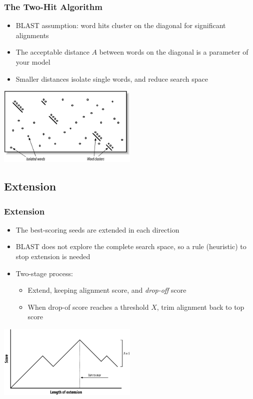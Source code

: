 \documentclass[table]{beamer}
\begin{document}
  \begin{frame}
    \frametitle{The Two-Hit Algorithm}
    \begin{itemize}
      \item BLAST assumption: word hits cluster on the diagonal for significant alignments
      \item The acceptable distance $A$ between words on the diagonal is a parameter of your model
      \item Smaller distances isolate single words, and reduce search space
    \end{itemize}
    \begin{center}
      \includegraphics[width=0.5\textwidth]{images/two_hit} 
    \end{center}    
  \end{frame}

  \subsection{Extension}
  \begin{frame}
    \frametitle{Extension}
    \begin{itemize}
      \item The best-scoring seeds are extended in each direction
      \item BLAST does not explore the complete search space, so a rule (heuristic) to stop extension is needed
      \item Two-stage process:
      \begin{itemize}
        \item Extend, keeping alignment score, and \emph{drop-off} score
        \item When drop-of score reaches a threshold $X$, trim alignment back to top score
      \end{itemize}
    \end{itemize}
    \begin{center}
      \includegraphics[width=0.5\textwidth]{images/extension} 
    \end{center}    
  \end{frame}
\end{document}
